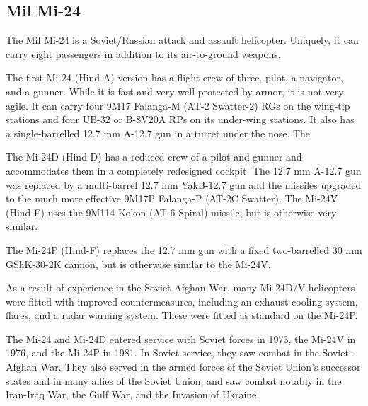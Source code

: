 \subsection{Mil Mi-24}

The Mil Mi-24 is a Soviet/Russian attack and assault helicopter. Uniquely, it can carry eight passengers in addition to its air-to-ground weapons.

The first Mi-24 (Hind-A) version has a flight crew of three, pilot, a navigator, and a gunner. While it is fast and very well protected by armor, it is not very agile. It can carry four 9M17 Falanga-M (AT-2 Swatter-2) RGs on the wing-tip stations and four UB-32  or B-8V20A  RPs on its under-wing stations. It also has a single-barrelled 12.7 mm A-12.7 gun in a turret under the nose. The 

The Mi-24D (Hind-D) has a reduced crew of a pilot and gunner and accommodates them in a completely redesigned cockpit. The 12.7 mm A-12.7 gun was replaced by a multi-barrel 12.7 mm YakB-12.7 gun and the missiles upgraded to the much more effective 9M17P Falanga-P (AT-2C Swatter). The Mi-24V (Hind-E) uses the 9M114 Kokon (AT-6 Spiral) missile, but is otherwise very similar.

The Mi-24P (Hind-F) replaces the 12.7 mm gun with a fixed two-barrelled 30 mm GShK-30-2K cannon, but is otherwise similar to the Mi-24V.

As a result of experience in the Soviet-Afghan War, many Mi-24D/V helicopters were fitted with improved countermeasures, including an exhaust cooling system, flares, and a radar warning system. These were fitted as standard on the Mi-24P.

The Mi-24 and Mi-24D entered service with Soviet forces in 1973, the Mi-24V in 1976, and the Mi-24P in 1981. In Soviet service, they saw combat in the Soviet-Afghan War. They also served in the armed forces of the Soviet Union's successor states and in many allies of the Soviet Union, and saw combat notably in the Iran-Iraq War, the Gulf War, and the Invasion of Ukraine.
